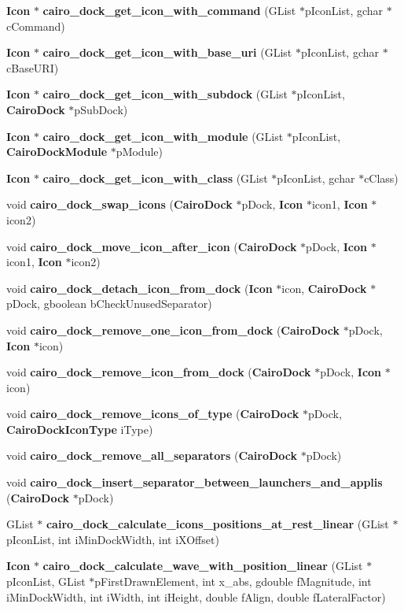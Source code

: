 \begin{CompactItemize}
{\bf Icon} $\ast$ {\bf cairo\_\-dock\_\-get\_\-icon\_\-with\_\-command} (GList $\ast$pIconList, gchar $\ast$cCommand)
\item 
{\bf Icon} $\ast$ {\bf cairo\_\-dock\_\-get\_\-icon\_\-with\_\-base\_\-uri} (GList $\ast$pIconList, gchar $\ast$cBaseURI)
\item 
{\bf Icon} $\ast$ {\bf cairo\_\-dock\_\-get\_\-icon\_\-with\_\-subdock} (GList $\ast$pIconList, {\bf CairoDock} $\ast$pSubDock)
\item 
{\bf Icon} $\ast$ {\bf cairo\_\-dock\_\-get\_\-icon\_\-with\_\-module} (GList $\ast$pIconList, {\bf CairoDockModule} $\ast$pModule)
\item 
{\bf Icon} $\ast$ {\bf cairo\_\-dock\_\-get\_\-icon\_\-with\_\-class} (GList $\ast$pIconList, gchar $\ast$cClass)
\item 
void {\bf cairo\_\-dock\_\-swap\_\-icons} ({\bf CairoDock} $\ast$pDock, {\bf Icon} $\ast$icon1, {\bf Icon} $\ast$icon2)
\item 
void {\bf cairo\_\-dock\_\-move\_\-icon\_\-after\_\-icon} ({\bf CairoDock} $\ast$pDock, {\bf Icon} $\ast$icon1, {\bf Icon} $\ast$icon2)
\item 
void {\bf cairo\_\-dock\_\-detach\_\-icon\_\-from\_\-dock} ({\bf Icon} $\ast$icon, {\bf CairoDock} $\ast$pDock, gboolean bCheckUnusedSeparator)
\item 
void {\bf cairo\_\-dock\_\-remove\_\-one\_\-icon\_\-from\_\-dock} ({\bf CairoDock} $\ast$pDock, {\bf Icon} $\ast$icon)
\item 
void {\bf cairo\_\-dock\_\-remove\_\-icon\_\-from\_\-dock} ({\bf CairoDock} $\ast$pDock, {\bf Icon} $\ast$icon)
\item 
void {\bf cairo\_\-dock\_\-remove\_\-icons\_\-of\_\-type} ({\bf CairoDock} $\ast$pDock, {\bf CairoDockIconType} iType)
\item 
void {\bf cairo\_\-dock\_\-remove\_\-all\_\-separators} ({\bf CairoDock} $\ast$pDock)
\item 
void {\bf cairo\_\-dock\_\-insert\_\-separator\_\-between\_\-launchers\_\-and\_\-applis} ({\bf CairoDock} $\ast$pDock)
\item 
GList $\ast$ {\bf cairo\_\-dock\_\-calculate\_\-icons\_\-positions\_\-at\_\-rest\_\-linear} (GList $\ast$pIconList, int iMinDockWidth, int iXOffset)
\item 
{\bf Icon} $\ast$ {\bf cairo\_\-dock\_\-calculate\_\-wave\_\-with\_\-position\_\-linear} (GList $\ast$pIconList, GList $\ast$pFirstDrawnElement, int x\_\-abs, gdouble fMagnitude, int iMinDockWidth, int iWidth, int iHeight, double fAlign, double fLateralFactor)

\end{CompactItemize}
